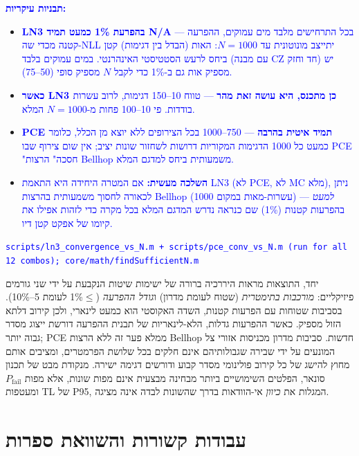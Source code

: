 \documentclass[12pt,a4paper]{article}
\DeclareRobustCommand{\aiedit}[1]{\textcolor{blue}{#1}}
\begin{document}
\aiedit{\textbf{תבניות עיקריות:}}
\begin{itemize}
  \item \aiedit{\textbf{LN3 בהפרעת 1\%{} כמעט תמיד N/A} — בכל התרחישים מלבד מים עמוקים, ההפרעה
        קטנה מכדי שה-NLL יתייצב מונוטונית עד $N=1000$: האות (הבדל בין דגימות) קטן ביחס
        לרעש הסטטיסטי האינהרנטי. במים עמוקים בלבד (עם מבנה CZ חד וחזק) יש מספיק אות גם
        ב-1\%{} כדי לקבל $N$ מספיק סופי (50--75).}
  \item \aiedit{\textbf{כאשר LN3 כן מתכנס, היא עושה זאת מהר} — טווח 10--150 דגימות, לרוב עשרות
        בודדות. פי 10--100 פחות מ-$N=1000$ המלא.}
  \item \aiedit{\textbf{PCE תמיד איטית בהרבה} — 750--1000 בכל הצירופים ללא יוצא מן הכלל, כלומר
        כמעט כל 1000 הדגימות המקוריות דרושות לשחזור שונות יציב; אין שום צירוף שבו PCE
        "חסכה" הרצות Bellhop משמעותית ביחס למדגם המלא.}
  \item \aiedit{\textbf{השלכה מעשית:} אם המטרה היחידה היא התאמת LN3 (לא PCE, לא MC מלא), ניתן
        לכאורה לחסוך משמעותית בהרצות Bellhop (עשרות-מאות במקום 1000) — \emph{למעט}
        בהפרעות קטנות (1\%{}) שם כנראה נדרש המדגם המלא בכל מקרה כדי לזהות אפילו את קיומו
        של אפקט קטן דיו.}
\end{itemize}
\aiedit{{\scriptsize\color[gray]{0.45}\textenglish{\texttt{scripts/ln3\_convergence\_vs\_N.m + scripts/pce\_conv\_vs\_N.m (run for all 12 combos); core/math/findSufficientN.m}}}}

יחד, התוצאות מראות היררכיה ברורה של ישימות שיטות
הנקבעת על ידי שני גורמים פיזיקליים: \emph{מורכבות בתימטרית} (שטוח לעומת מדרון)
ו\emph{גודל ההפרעה} ($\leq$1\%{} לעומת 5--10\%{}).
בסביבות שטוחות עם הפרעות קטנות, השדה האקוסטי הוא כמעט לינארי,
ולכן קירוב דלתא הזול מספיק.
כאשר ההפרעות גדלות, הלא-לינאריות של תבנית ההפרעה דורשת ייצוג מסדר גבוה יותר;
\textenglish{PCE} ממלא פער זה ללא הרצות \textenglish{Bellhop} חדשות.
סביבות מדרון מכניסות אזורי צל המונעים על ידי שבירה שגבולותיהם
אינם חלקים בכל שלושת הפרמטרים, ומציבים אותם מחוץ להישג של כל קירוב פולינומי מסדר קבוע
ודורשים דגימה ישירה.
מנקודת מבט של תכנון סונאר, הפלטים השימושיים ביותר מבחינה מבצעית אינם
מפות שונות, אלא מפות $P_\mathrm{fail}$ ומעטפות TL של P95,
המגלות את \emph{כיוון} אי-הוודאות בדרך שהשונות לבדה אינה מציגה.

\section{עבודות קשורות והשוואת ספרות}
\label{sec:related}
\end{document}
